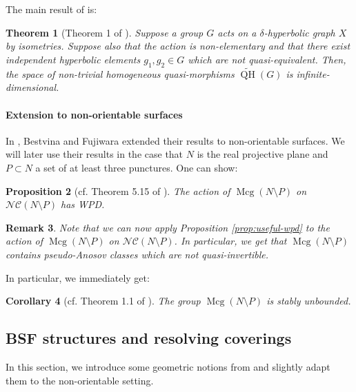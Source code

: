 \documentclass[10pt,a4paper]{amsart}
\newtheorem{theorem}{Theorem}[section]
\newtheorem{remark}[theorem]{Remark}
\newtheorem{corollary}[theorem]{Corollary}
\newtheorem{proposition}[theorem]{Proposition}
\newcommand{\ncg}{\mathcal{NC}}
\begin{document}
The main result of \cite{Bestvina} is:
\begin{theorem}[Theorem 1 of \cite{Bestvina}]\label{thm:bestvina-fujiwara-main-thm}
Suppose a group $G$ acts on a $\delta$-hyperbolic graph $X$ by isometries.
Suppose also that the action is non-elementary and that there exist independent hyperbolic elements $g_1,g_2 \in G$ which are not quasi-equivalent.
Then, the space of non-trivial homogeneous quasi-morphisms $\widetilde{\operatorname{QH}}(G)$ is infinite-dimensional.
\end{theorem}

\paragraph{Extension to non-orientable surfaces}
In \cite{Bestvina-refinement}, Bestvina and Fujiwara extended their results to non-orientable surfaces.
We will later use their results in the case that $N$ is the real projective plane and $P\subset N$ a set of at least three punctures.
One can show:

\begin{proposition}[cf. Theorem 5.15 of \cite{Bestvina-refinement}]\label{prop:wpd-downstairs}
    The action of $\operatorname{Mcg}(N\setminus P)$ on $\ncg(N\setminus P)$ has WPD.
\end{proposition}

\begin{remark}
Note that we can now apply Proposition \ref{prop:useful-wpd} to the action of $\operatorname{Mcg}(N\setminus P)$ on $\ncg(N\setminus P)$.
In particular, we get that $\operatorname{Mcg}(N\setminus P)$ contains pseudo-Anosov classes which are not quasi-invertible.    
\end{remark}

In particular, we immediately get:
\begin{corollary}[cf. Theorem 1.1 of \cite{Bestvina-refinement}]
    The group $\operatorname{Mcg}(N\setminus P)$ is stably unbounded.
\end{corollary}

\subsection{BSF structures and resolving coverings}\label{subsec:bsf}
In this section, we introduce some geometric notions from \cite{BHW2} and slightly adapt them to the non-orientable setting.
\end{document}
